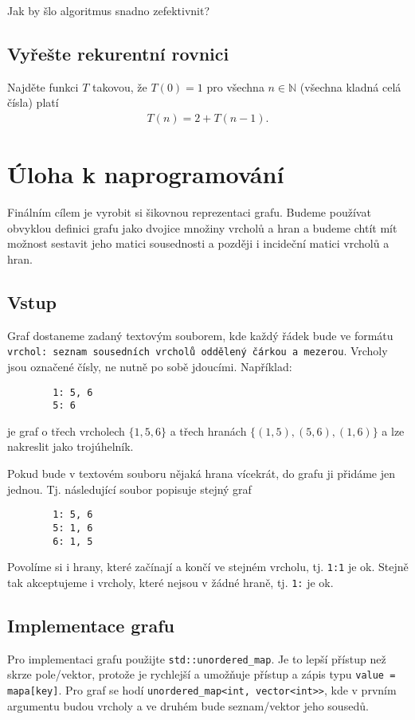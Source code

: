 \documentclass[12pt,oneside]{article}
\begin{document}
	Jak by šlo algoritmus snadno zefektivnit?
	
	\subsection{Vyřešte rekurentní rovnici}
	Najděte funkci $T$ takovou, že $T(0) = 1$ pro všechna $n \in \mathbb{N}$ (všechna kladná celá čísla) platí
	\begin{align}
		T(n) = 2 + T(n-1).
	\end{align}
	
	\section{Úloha k naprogramování}
	Finálním cílem je vyrobit si šikovnou reprezentaci grafu.
	Budeme používat obvyklou definici grafu jako dvojice  množiny vrcholů a hran a budeme chtít mít možnost sestavit jeho matici sousednosti a později i incideční matici vrcholů a hran.
	\subsection{Vstup}
	Graf dostaneme zadaný textovým souborem, kde každý řádek bude ve formátu \newline
	\verb|vrchol: seznam sousedních vrcholů oddělený čárkou a mezerou|.
	\newline
	Vrcholy jsou označené čísly, ne nutně po sobě jdoucími.  
	Například:
	\begin{verbatim}
		1: 5, 6
		5: 6
	\end{verbatim}
	je graf o třech vrcholech $\{1, 5, 6\}$ a třech hranách $\{(1, 5), (5, 6), (1, 6)\}$ a lze nakreslit jako trojúhelník.
	
	Pokud bude v textovém souboru nějaká hrana vícekrát, do grafu ji přidáme jen jednou.
	Tj. následující soubor popisuje stejný graf
	\begin{verbatim}
		1: 5, 6
		5: 1, 6
		6: 1, 5
	\end{verbatim}
	Povolíme si i hrany, které začínají a končí ve stejném vrcholu, tj. \verb*|1:1| je ok.
	Stejně tak akceptujeme i vrcholy, které nejsou v žádné hraně, tj. \verb*|1:| je ok.
	
	
	\subsection{Implementace grafu}
	Pro implementaci grafu použijte \verb*|std::unordered_map|. Je to lepší přístup než skrze pole/vektor, protože je rychlejší a umožňuje přístup a zápis typu \verb*|value = mapa[key]|.
	Pro graf se hodí  \verb*|unordered_map<int, vector<int>>|, kde v prvním argumentu budou vrcholy a ve druhém bude seznam/vektor jeho sousedů.
	
\end{document}
